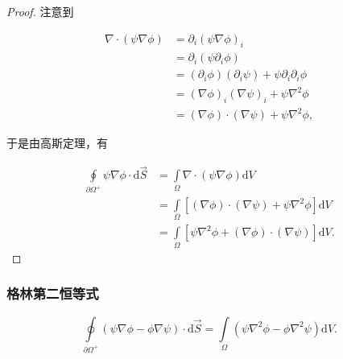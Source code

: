 \begin{proof}

注意到

\begin{equation}
\begin{split}
\nabla\cdot(\psi\nabla\phi)
&=\partial_i(\psi\nabla\phi)_i \\
&=\partial_i(\psi\partial_i\phi) \\
&=(\partial_i \phi)(\partial_i\psi) + \psi\partial_i\partial_i\phi \\
&=(\nabla\phi)_i(\nabla\psi)_i + \psi\nabla^2\phi \\
&=(\nabla\phi)\cdot(\nabla\psi) + \psi\nabla^2\phi,
\end{split}
\end{equation}

于是由高斯定理，有

\begin{equation}
\begin{split}
\oint\limits_{\partial\Omega^+} \psi\nabla\phi\cdot\mathrm{d}\vec{S}
&=\int\limits_{\Omega} \nabla\cdot(\psi\nabla\phi)\mathrm{d}V \\
&=\int\limits_{\Omega} \left[(\nabla\phi)\cdot(\nabla\psi) + \psi\nabla^2\phi \right]\mathrm{d}V \\
&=\int\limits_{\Omega} \left[\psi\nabla^2\phi + (\nabla\phi)\cdot(\nabla\psi) \right]\mathrm{d}V .
\end{split}
\end{equation}

\end{proof}

\subsubsection{格林第二恒等式}

\begin{example}
\begin{equation}
\oint\limits_{\partial\Omega^+}\left(\psi\nabla\phi-\phi\nabla\psi \right)\cdot\mathrm{d}\vec{S} =\int\limits_{\Omega} \left(\psi\nabla^2\phi-\phi\nabla^2\psi\right)\mathrm{d}V.
\end{equation}
\end{example}

